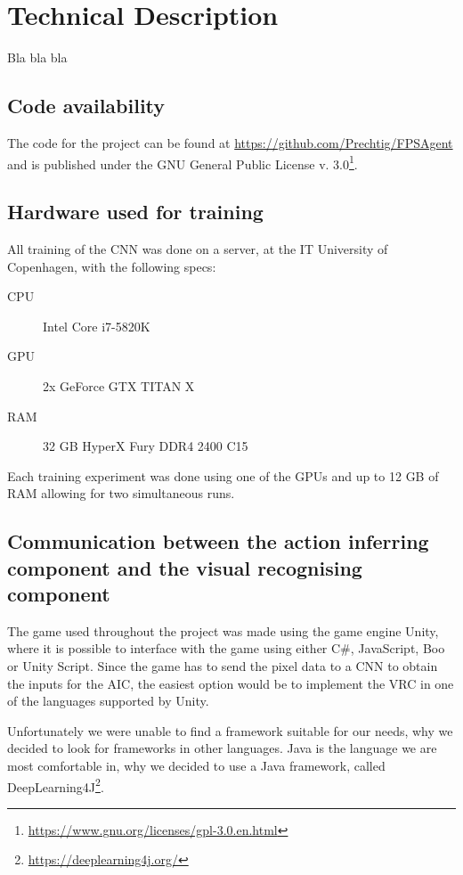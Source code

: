 
\section{Technical Description}
Bla bla bla

\subsection{Code availability}
The code for the project can be found at \url{https://github.com/Prechtig/FPSAgent} and is published under the GNU General Public License v. 3.0\footnote{\url{https://www.gnu.org/licenses/gpl-3.0.en.html}}.

\subsection{Hardware used for training}
\label{sub:hardware}
All training of the CNN was done on a server, at the IT University of Copenhagen, with the following specs:

\begin{description}
	\item [CPU] Intel\textsuperscript{\textregistered} Core\textsuperscript{\texttrademark} i7-5820K
	\item [GPU] 2x GeForce\textsuperscript{\textregistered} GTX TITAN X
	\item [RAM] 32 GB HyperX Fury DDR4 2400 C15
\end{description}	

\noindent
Each training experiment was done using one of the GPUs and up to 12 GB of RAM allowing for two simultaneous runs.

\subsection{Communication between the action inferring component and the visual recognising component}
The game used throughout the project was made using the game engine Unity, where it is possible to interface with the game using either C\#, JavaScript, Boo or Unity Script. Since the game has to send the pixel data to a CNN to obtain the inputs for the AIC, the easiest option would be to implement the VRC in one of the languages supported by Unity.

Unfortunately we were unable to find a framework suitable for our needs, why we decided to look for frameworks in other languages. Java is the language we are most comfortable in, why we decided to use a Java framework, called DeepLearning4J\footnote{\url{https://deeplearning4j.org/}}.

